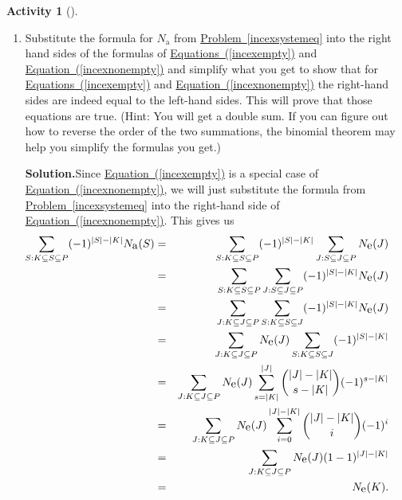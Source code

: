\documentclass[10pt,]{book}
\theoremstyle{plain}
\theoremstyle{definition}
\newtheorem{activity}[project]{Activity}
\numberwithin{equation}{chapter}
\newcommand{\amp}{&}
\begin{document}
\begin{activity}[]\label{activity-216}
~\par
\begin{enumerate}[label=(\alph*)]
 \item Substitute the formula for \(N_{\mbox{a} }\) from \hyperref[incexsystemeq]{Problem~\ref{incexsystemeq}} into the right hand sides of the formulas of \hyperref[incexempty]{Equations~(\ref{incexempty})} and \hyperref[incexnonempty]{Equation~(\ref{incexnonempty})} and simplify what you get to show that for \hyperref[incexempty]{Equations~(\ref{incexempty})} and \hyperref[incexnonempty]{Equation~(\ref{incexnonempty})} the right-hand sides are indeed equal to the left-hand sides. This will prove that those equations are true. (Hint: You will get a double sum. If you can figure out how to reverse the order of the two summations, the binomial theorem may help you simplify the formulas you get.)%
\par\medskip\noindent%
\textbf{Solution.}\quad Since \hyperref[incexempty]{Equation~(\ref{incexempty})} is a special case of \hyperref[incexnonempty]{Equation~(\ref{incexnonempty})}, we will just substitute the formula from \hyperref[incexsystemeq]{Problem~\ref{incexsystemeq}} into the right-hand side of \hyperref[incexnonempty]{Equation~(\ref{incexnonempty})}. This gives us%
\begin{align*}
\hspace{-.25 in}\sum_{S: K\subseteq S\subseteq P}
(-1)^{|S|-|K|}N_{\mbox{a} }(S)\amp =\amp \sum_{S: K\subseteq S\subseteq P}
(-1)^{|S|-|K|}\sum_{J: S\subseteq
J\subseteq P}N_{\mbox{e} }(J)\\
\amp =\amp \sum_{S: K\subseteq S\subseteq P}
\sum_{J: S\subseteq
J\subseteq P}(-1)^{|S|-|K|}N_{\mbox{e} }(J)\\
\amp =\amp \sum_{J:K\subseteq J\subseteq P}\sum_{S:K\subseteq S\subseteq J}
(-1)^{|S|-|K|}N_{\mbox{e} }(J)\\
\amp =\amp \sum_{J:K\subseteq J\subseteq P}N_{\mbox{e} }(J)\sum_{S:K\subseteq
S\subseteq J} (-1)^{|S|-|K|}\\
\amp =\amp \sum_{J:K\subseteq J\subseteq P}N_{\mbox{e} }(J)\sum_{s=|K|}^{|J|}
\binom{|J|-|K|
}{s-|K|}(-1)^{s-|K|}\\
\amp =\amp \sum_{J:K\subseteq J\subseteq P}N_{\mbox{e} }(J)\sum_{i=0}^{|J|-|K|}
\binom{|J|-|K|
}{i}(-1)^{i}\\
\amp =\amp \sum_{J:K\subseteq J\subseteq
P}N_{\mbox{e} }(J)(1-1)^{|J|-|K|}\\
\amp =\amp N_{\mbox{e} }(K).
\end{align*}

\end{enumerate}
\end{activity}
\end{document}
